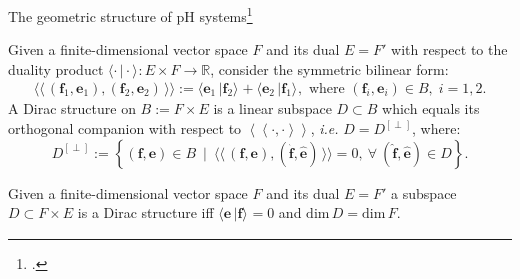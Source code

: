 \documentclass[aspectratio=169]{beamer}
\newcommand{\dualpr}[3][]{\ensuremath{\langle #2 \, \vert #3 \rangle_{#1}}}
\newcommand{\bilprod}[2]{\langle \langle \, #1, #2 \, \rangle \rangle}
\begin{document}
\begin{frame}{The geometric structure of pH systems\footcite{courant1990}}
	\begin{definition}
		Given a finite-dimensional vector space ${F}$ and its dual ${E}=F'$ with respect to the duality product $\dualpr{\cdot}{\cdot} : {E} \times {F} \rightarrow \mathbb{R}$, consider the symmetric bilinear form:
		$$
		\bilprod{(\mathbf{f}_1, \mathbf{e}_1)}{(\mathbf{f}_2, \mathbf{e}_2)} := {\dualpr{\mathbf{e}_1}{\mathbf{f}_2}} + {\dualpr{\mathbf{e}_2}{\mathbf{f}_1}}, \text{ where } (\mathbf{f}_i, \mathbf{e}_i) \in {B}, \; i = 1, 2.
		$$
		A Dirac structure on ${B} := {F} \times {E}$ is a linear subspace ${D} \subset {B}$ which equals its orthogonal companion with respect to $\left\langle \left\langle \cdot, \cdot \right\rangle \right\rangle$, {\it i.e.} ${D} ={D}^{[\perp]}$, where:
		$$
		{D}^{[\perp]} := \left\{ (\mathbf{f}, \mathbf{e}) \in {B} ~ \mid ~ \bilprod{(\mathbf{f}, \mathbf{e})}{(\widehat{\mathbf{f}}, \widehat{\mathbf{e}})} = 0, ~ \forall ~ (\widehat{\mathbf{f}}, \widehat{\mathbf{e}}) \in {D} \right\}.
		$$
	\end{definition}
	\begin{theorem}
		Given a finite-dimensional vector space ${F}$ and its dual ${E}=F'$ a subspace $D \subset F × E$ is a Dirac structure iff $\dualpr{\mathbf{e}}{\mathbf{f}}=0$ and $\mathrm{dim}\, D = \mathrm{dim}\, F$.
	\end{theorem}
\end{frame}
\end{document}
